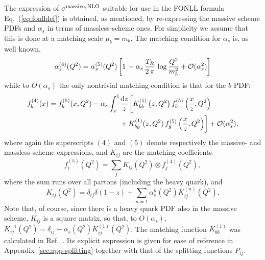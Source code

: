 The expression of $\sigma^{\rm massive,\,NLO}$ suitable for use in the
FONLL formula Eq.~(\ref{eq:fonlldef}) is obtained, as mentioned, by
  re-expressing the massive scheme PDFs  and $\alpha_s$ in terms of massless-scheme
  ones. For simplicity we assume that this is done at a matching scale
  $\mu_b=m_b$.
  The matching condition for $\alpha_s$ is, as well known,
\begin{equation} \label{eq:amatch}
  \alpha_s^{(4)}(Q^2) = \alpha^{(5)}_s(Q^2)\left[1\,-\alpha_s\,\frac{T_R}{2\,\pi}\,\log\frac{Q^2}{m_b^2} + {\cal O}(\alpha_s^2)\right]
\end{equation}
while to $O(\alpha_s)$ the only nontrivial matching condition is
that for the $b$ PDF:
\begin{equation}
  \label{eq:b-pdf}
  \begin{split}
  f_b^{(4)}(x) = f^{(5)}_b(x,Q^2) - \alpha_s\int_x^1& \frac{{\rm d}{z}}{z}
  \biggl[ K_{bb}^{(1)}\left(z,Q^2\right)f^{(5)}_b\left(\frac{x}{z},Q^2\right) \\
   &+ K_{bg}^{(1)}(z,Q^2)\,f_g^{(5)}\left(\frac{x}{z},Q^2\right)\biggr]+ {\cal O}(\alpha_s^2),
  \end{split}
\end{equation}
where again the superscripts $(4)$ and  $(5)$  denote  respectively the massive-
and massless-scheme expressions, and $K_{ij}$ are the matching
coefficients
\begin{equation}\label{eq:matching}
  f_i^{(5)}(Q^2) = \sum_j K_{ij}(Q^2) \otimes f^{(4)}_j(Q^2),
\end{equation}
where the sum runs over all partons (including the heavy quark),
and
\begin{equation}\label{eq:kexp}
  K_{ij}(Q^2)=\delta_{ij}\delta(1-z)+\sum_{n=1}\alpha^n_s(Q^2) K_{ij}^{(n)}(Q^2).
\end{equation}
Note
that, of course, since there is a heavy quark PDF also in the massive
scheme, $K_{ij}$ is a square matrix, so that, to $O(\alpha_s)$,
$  K^{-1}_{ij}(Q^2)=\delta_{ij}-\alpha_s(Q^2) K_{ij}^{(1)}(Q^2)$.
The matching function 
 $K^{(1)}_{bb}$ was calculated in Ref.~\cite{Buza:1996wv}. Its explicit
expression is given for ease of reference in Appendix~\ref{sec:app-splitting} together with
that of the splitting functions
$P_{ij}$. 

